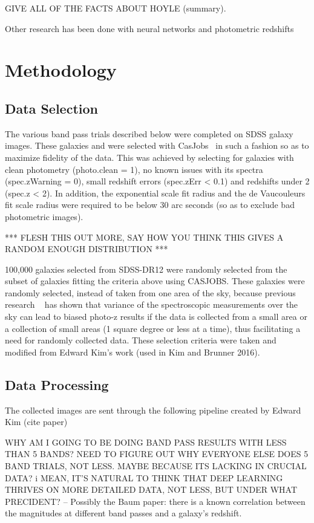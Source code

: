 \documentclass[fleqn,usenatbib]{mnras}
\begin{document}
GIVE ALL OF THE FACTS ABOUT HOYLE (summary).

Other research has been done with neural networks and photometric redshifts ~\citep{hoyle_measuring_2015}   

  
\section{Methodology}
  \label{sec:method}

\subsection{Data Selection}
   \label{sec:data_sel}   
The various band pass trials described below were completed on SDSS galaxy images.  These galaxies and were selected with CasJobs~\citep{li_casjobs_2008} in such a fashion so as to maximize fidelity of the data.  This was achieved by selecting for galaxies with clean photometry (photo.clean = 1), no known issues with its spectra (spec.zWarning = 0), small redshift errors (spec.zErr < 0.1) and redshifts under 2 (spec.z < 2).  In addition, the exponential scale fit radius and the de Vaucouleurs fit scale radius were required to be below 30 arc seconds (so as to exclude bad photometric images).

*** FLESH THIS OUT MORE, SAY HOW YOU THINK THIS GIVES A RANDOM ENOUGH DISTRIBUTION ***

100,000 galaxies selected from SDSS-DR12 were randomly selected from the subset of galaxies fitting the criteria above using CASJOBS.  These galaxies were randomly selected, instead of taken from one area of the sky, because previous research ~\citep{cunha_sample_2012} has shown that variance of the spectroscopic measurements over the sky can lead to biased photo-z results if the data is collected from a small area or a collection of small areas (1 square degree or less at a time), thus facilitating a need for randomly collected data.  These selection criteria were taken and modified from Edward Kim's work (used in Kim and Brunner 2016).

\subsection{Data Processing}
  \label{sec:data_proc}
The collected images are sent through the following pipeline created by Edward Kim (cite paper)


WHY AM I GOING TO BE DOING BAND PASS RESULTS WITH LESS THAN 5 BANDS? NEED TO FIGURE OUT WHY EVERYONE ELSE DOES 5 BAND TRIALS, NOT LESS.  MAYBE BECAUSE ITS LACKING IN CRUCIAL DATA? i MEAN, IT'S NATURAL TO THINK THAT DEEP LEARNING THRIVES ON MORE DETAILED DATA, NOT LESS, BUT UNDER WHAT PRECIDENT? -- Possibly the Baum paper: there is a known correlation between the magnitudes at different band passes and a galaxy's redshift.
\end{document}
